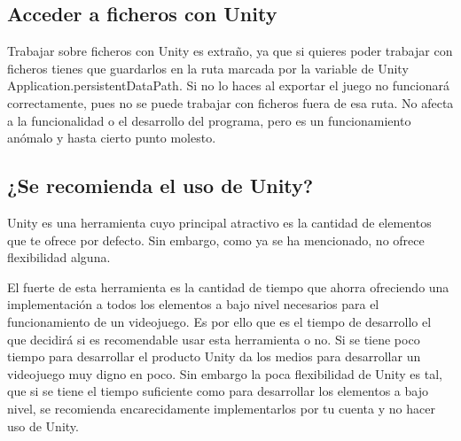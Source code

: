 \subsection{Acceder a ficheros con Unity}
Trabajar sobre ficheros con Unity es extraño, ya que si quieres poder trabajar con ficheros tienes que guardarlos en la ruta marcada por la variable de Unity Application.persistentDataPath. Si no lo haces al exportar el juego no funcionará correctamente, pues no se puede trabajar con ficheros fuera de esa ruta.
No afecta a la funcionalidad o el desarrollo del programa, pero es un funcionamiento anómalo y hasta cierto punto molesto.

\subsection{¿Se recomienda el uso de Unity?}
Unity es una herramienta cuyo principal atractivo es la cantidad de elementos que te ofrece por defecto. Sin embargo, como ya se ha mencionado, no ofrece flexibilidad alguna.

El fuerte de esta herramienta es la cantidad de tiempo que ahorra ofreciendo una implementación a todos los elementos a bajo nivel necesarios para el funcionamiento de un videojuego. Es por ello que es el tiempo de desarrollo el que decidirá si es recomendable usar esta herramienta o no. Si se tiene poco tiempo para desarrollar el producto Unity da los medios para desarrollar un videojuego muy digno en poco. Sin embargo la poca flexibilidad de Unity es tal, que si se tiene el tiempo suficiente como para desarrollar los elementos a bajo nivel, se recomienda encarecidamente implementarlos por tu cuenta y no hacer uso de Unity.


